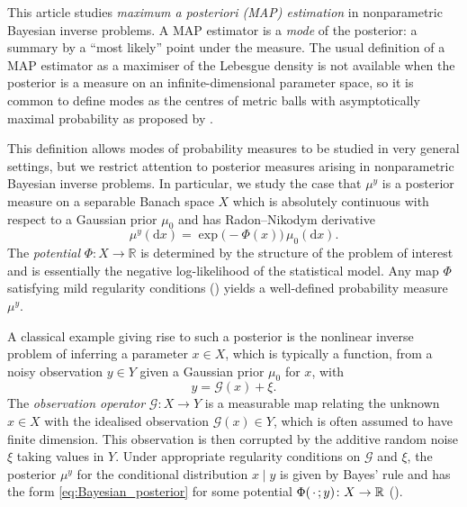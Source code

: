 \documentclass[11pt]{article}
\newcommand*{\defterm}{\emph}%
\newcommand*{\quark}{\setbox0\hbox{$x$}\hbox to\wd0{\hss$\cdot$\hss}}
\newcommand*{\rd}{\mathrm{d}}
\newcommand*{\Reals}{\mathbb{R}}
\theoremstyle{plain}
\theoremstyle{definition}
\numberwithin{equation}{section}
\numberwithin{figure}{section}
\numberwithin{table}{section}
\begin{document}
This article studies \emph{maximum a posteriori (MAP) estimation} in nonparametric Bayesian inverse problems.
A MAP estimator is a \emph{mode} of the posterior:
a summary by a ``most likely'' point under the measure.
The usual definition of a MAP estimator as a maximiser of the Lebesgue density is not available when the posterior is a measure on an infinite-dimensional parameter space, so it is common to define modes as the centres of metric balls with asymptotically maximal probability as proposed by \citet{DashtiLawStuartVoss2013}.

This definition allows modes of probability measures to be studied in very general settings, but we restrict attention to posterior measures arising in nonparametric Bayesian inverse problems.
In particular, we study the case that $\mu^y$ is a posterior measure on a separable Banach space $X$ which is absolutely continuous with respect to a Gaussian prior $\mu_0$ and has Radon--Nikodym derivative
\begin{equation}
	\label{eq:Bayesian_posterior}
	\mu^y(\rd x) = \exp\bigl(-\Phi(x)\bigr) \,\mu_0(\rd x).
\end{equation}
The \emph{potential} $\Phi \colon X \to \Reals$ is determined by the structure of the problem of interest and is essentially the negative log-likelihood of the statistical model.
Any map $\Phi$ satisfying mild regularity conditions () yields a well-defined probability measure $\mu^{y}$.

A classical example giving rise to such a posterior is the nonlinear inverse problem of inferring a parameter $x \in X$, which is typically a function, from a noisy observation $y \in Y$ given a Gaussian prior $\mu_0$ for $x$, with
\begin{equation}
	\label{eq:additive-noise_BIP}
	y = \mathcal{G}(x) + \xi.
\end{equation}
The \defterm{observation operator} $\mathcal{G} \colon X \to Y$ is a measurable map relating the unknown $x \in X$ with the idealised observation $\mathcal{G}(x) \in Y$, which is often assumed to have finite dimension.
This observation is then corrupted by the additive random noise $\xi$ taking values in $Y$.
Under appropriate regularity conditions on $\mathcal{G}$ and $\xi$, the posterior $\mu^y$ for the conditional distribution $x \mid y$ is given by Bayes' rule and has the form \eqref{eq:Bayesian_posterior} for some potential $\Phi(\quark; y) \colon X \to \Reals$ ().
\end{document}
